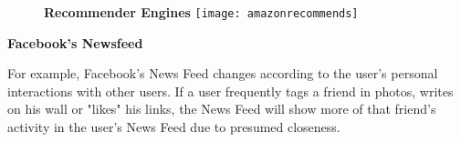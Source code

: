 \documentclass[MASTER.tex]{subfiles}
\begin{document}
 \begin{figure}
\textbf{ Recommender Engines}
\centering
\texttt{[image: amazonrecommends]}

\end{figure}

 
  

 
  
 \textbf{Facebook's Newsfeed}
  
  For example, Facebook's News Feed changes according to the user's personal interactions with other users. 
  If a user frequently tags a friend in photos, writes on his wall or "likes" his links, the News Feed will show more of that friend's activity in the user's News Feed due to presumed closeness.
  
 
 
 
\end{document}
